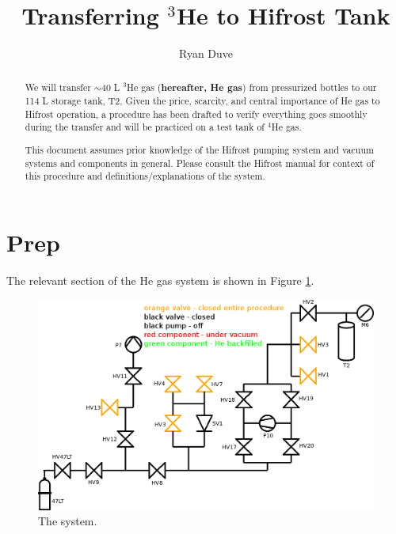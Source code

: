 \documentclass[a4paper,10pt]{article}
\title{Transferring $^3$He to Hifrost Tank}
\author{Ryan Duve}
\begin{document}
\maketitle

\begin{abstract}

\vspace{.5cm}


We will transfer $\sim$40 L $^3$He gas (\textbf{hereafter, He gas}) from pressurized bottles to our 114 L storage tank, T2.  Given the price, scarcity, and central importance of He gas to Hifrost operation, a procedure has been drafted to verify everything goes smoothly during the transfer and will be practiced on a test tank of $^4$He gas.

This document assumes prior knowledge of the Hifrost pumping system and vacuum systems and components in general.  Please consult the Hifrost manual for context of this procedure and definitions/explanations of the system.
\end{abstract}

\section{Prep}
The relevant section of the He gas system is shown in Figure \ref{a}.\begin{figure}[htbp!]
 \centering
 \includegraphics[width=\textwidth]{./he-3-transfer-02-closed-valves.png}
 \caption{The system.}
 \label{a}
\end{figure}
\end{document}
